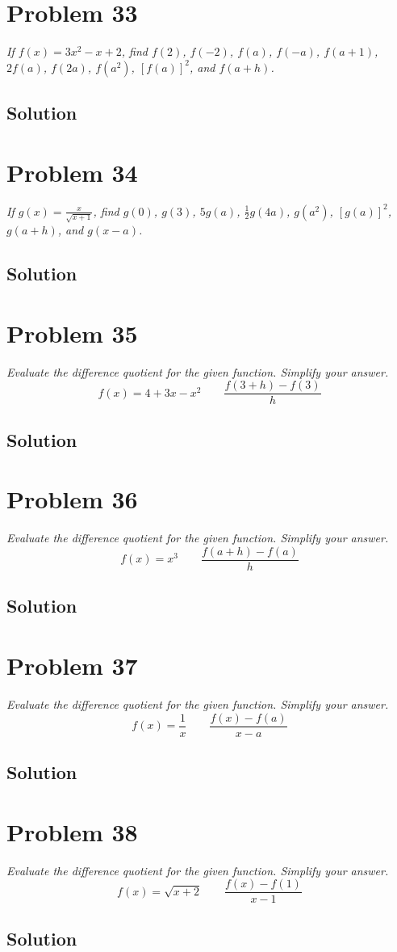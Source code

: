 \documentclass[11pt]{article}
\newcommand{\soln}{\subsection*}
\newcommand{\qn}{\textit}
\begin{document}
\section*{Problem 33}

\qn{If $f(x)=3x^2-x+2$, find $f(2)$, $f(-2)$, $f(a)$, $f(-a)$, $f(a+1)$, $2f(a)$, $f(2a)$, $f(a^2)$, $[f(a)]^2$, and $f(a+h)$.}

\soln{Solution}

\section*{Problem 34}

\qn{If $g(x)=\frac{x}{\sqrt{x+1}}$, find $g(0)$, $g(3)$, $5g(a)$, $\frac{1}{2}g(4a)$, $g(a^2)$, $[g(a)]^2$, $g(a+h)$, and $g(x-a)$.}

\soln{Solution}

\section*{Problem 35}

\qn{Evaluate the difference quotient for the given function. Simplify your answer. $$f(x)=4+3x-x^2 \qquad \frac{f(3+h)-f(3)}{h}$$}

\soln{Solution}

\section*{Problem 36}

\qn{Evaluate the difference quotient for the given function. Simplify your answer. $$f(x)=x^3 \qquad \frac{f(a+h)-f(a)}{h}$$}

\soln{Solution}

\section*{Problem 37}

\qn{Evaluate the difference quotient for the given function. Simplify your answer. $$f(x)=\frac{1}{x} \qquad \frac{f(x)-f(a)}{x-a}$$}

\soln{Solution}

\section*{Problem 38}

\qn{Evaluate the difference quotient for the given function. Simplify your answer. $$f(x)=\sqrt{x+2} \qquad \frac{f(x)-f(1)}{x-1}$$}

\soln{Solution}
\end{document}
